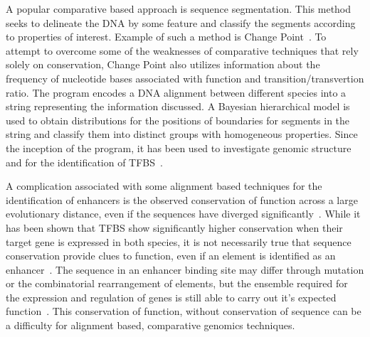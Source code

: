        A popular comparative based approach is sequence segmentation. This method seeks to delineate the DNA by some feature and classify the segments according to properties of interest.
        Example of such a method is Change Point~\cite{keith2006segmenting}. To attempt to overcome some of the weaknesses of comparative techniques that rely solely on conservation, Change Point also utilizes information about the frequency of nucleotide bases associated with function and transition/transvertion ratio. The program encodes a DNA alignment between different species into a string representing the information discussed. A Bayesian hierarchical model is used to obtain distributions for the positions of boundaries for segments in the string and classify them into distinct groups with homogeneous properties. Since the inception of the program, it has been used to investigate genomic structure and for the identification of TFBS~\cite{algama2014investigating, algama2017genome}. 
        
         A complication associated with some alignment based techniques for the identification of enhancers is the observed conservation of function across a large evolutionary distance, even if the sequences have diverged significantly~\cite{tautz2000evolution, pennacchio2013enhancers}. While it has been shown that TFBS show significantly higher conservation when their target gene is expressed in both species, it is not necessarily true that sequence conservation provide clues to function, even if an element is identified as an enhancer~\cite{hemberg2011conservation, pennacchio2013enhancers}.
         The sequence in an enhancer binding site may differ through mutation or the combinatorial rearrangement of elements, but the ensemble required for the expression and regulation of genes is still able to carry out it's expected function~\cite{wong2014decoupling}. This conservation of function, without conservation of sequence can be a difficulty for alignment based, comparative genomics techniques. 



